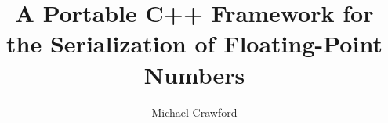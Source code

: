 \documentclass[11pt]{asu}
\title{A Portable C++ Framework for the Serialization of Floating-Point Numbers}
\author{Michael Crawford}
\begin{document}
	\begin{preliminary}
		\maketitle
        \makecopyright
        
		\tableofcontents
        \listoftables
        \listoffigures
        \lstlistoflistings
	\end{preliminary}


		\begin{doublespace}
	    
	    
	    
      
      
      
		\end{doublespace}

	\newpage
    
	
    \nocite{*}
    \begin{appendices}
      \begin{singlespace}
        
      \end{singlespace}    
    \end{appendices}
\end{document}
